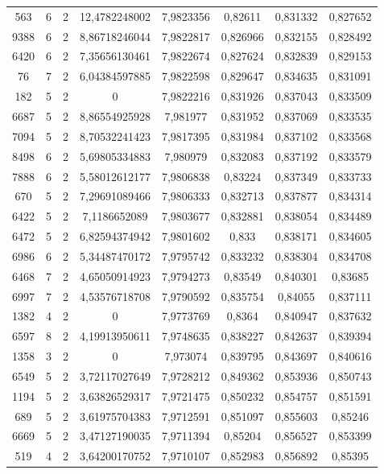 \begin{longtable}{|c|c|c|c|c|c|c|c|}
563 & 6 & 2 & 12,4782248002 & 7,9823356 & 0,82611 & 0,831332 & 0,827652 \\
9388 & 6 & 2 & 8,86718246044 & 7,9822817 & 0,826966 & 0,832155 & 0,828492 \\
6420 & 6 & 2 & 7,35656130461 & 7,9822674 & 0,827624 & 0,832839 & 0,829153 \\
76 & 7 & 2 & 6,04384597885 & 7,9822598 & 0,829647 & 0,834635 & 0,831091 \\
182 & 5 & 2 & 0 & 7,9822216 & 0,831926 & 0,837043 & 0,833509 \\
6687 & 5 & 2 & 8,86554925928 & 7,981977 & 0,831952 & 0,837069 & 0,833535 \\
7094 & 5 & 2 & 8,70532241423 & 7,9817395 & 0,831984 & 0,837102 & 0,833568 \\
8498 & 6 & 2 & 5,69805334883 & 7,980979 & 0,832083 & 0,837192 & 0,833579 \\
7888 & 6 & 2 & 5,58012612177 & 7,9806838 & 0,83224 & 0,837349 & 0,833733 \\
670 & 5 & 2 & 7,29691089466 & 7,9806333 & 0,832713 & 0,837877 & 0,834314 \\
6422 & 5 & 2 & 7,1186652089 & 7,9803677 & 0,832881 & 0,838054 & 0,834489 \\
6472 & 5 & 2 & 6,82594374942 & 7,9801602 & 0,833 & 0,838171 & 0,834605 \\
6986 & 6 & 2 & 5,34487470172 & 7,9795742 & 0,833232 & 0,838304 & 0,834708 \\
6468 & 7 & 2 & 4,65050914923 & 7,9794273 & 0,83549 & 0,840301 & 0,83685 \\
6997 & 7 & 2 & 4,53576718708 & 7,9790592 & 0,835754 & 0,84055 & 0,837111 \\
1382 & 4 & 2 & 0 & 7,9773769 & 0,8364 & 0,840947 & 0,837632 \\
6597 & 8 & 2 & 4,19913950611 & 7,9748635 & 0,838227 & 0,842637 & 0,839394 \\
1358 & 3 & 2 & 0 & 7,973074 & 0,839795 & 0,843697 & 0,840616 \\
6549 & 5 & 2 & 3,72117027649 & 7,9728212 & 0,849362 & 0,853936 & 0,850743 \\
1194 & 5 & 2 & 3,63826529317 & 7,9721475 & 0,850232 & 0,854757 & 0,851591 \\
689 & 5 & 2 & 3,61975704383 & 7,9712591 & 0,851097 & 0,855603 & 0,85246 \\
6669 & 5 & 2 & 3,47127190035 & 7,9711394 & 0,85204 & 0,856527 & 0,853399 \\
519 & 4 & 2 & 3,64200170752 & 7,9710107 & 0,852983 & 0,856892 & 0,85395 \\

\end{longtable}
